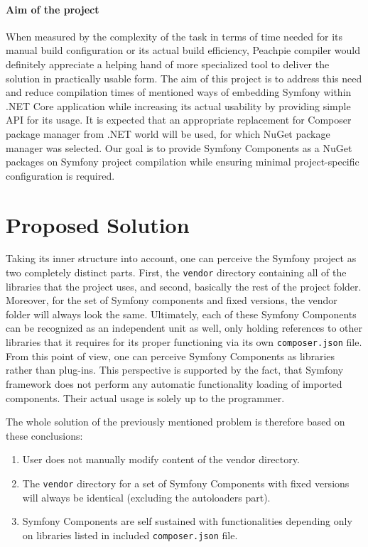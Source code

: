 \paragraph{Aim of the project} When measured by the complexity of the task in terms of time needed for its manual build configuration or its actual build efficiency, Peachpie compiler would definitely appreciate a helping hand of more specialized tool to deliver the solution in practically usable form. The aim of this project is to address this need and reduce compilation times of mentioned ways of embedding Symfony within .NET Core application while increasing its actual usability by providing simple API for its usage. It is expected that an appropriate replacement for Composer package manager from .NET world will be used, for which NuGet package manager was selected. Our goal is to provide Symfony Components as a NuGet packages on Symfony project compilation while ensuring minimal project-specific configuration is required.



\section{Proposed Solution}
Taking its inner structure into account, one can perceive the Symfony project as two completely distinct parts. First, the \texttt{vendor} directory containing all of the libraries that the project uses, and second, basically the rest of the project folder. Moreover, for the set of Symfony components and fixed versions, the vendor folder will always look the same. Ultimately, each of these Symfony Components can be recognized as an independent unit as well, only holding references to other libraries that it requires for its proper functioning via its own \texttt{composer.json} file. From this point of view, one can perceive Symfony Components as libraries rather than plug-ins. This perspective is supported by the fact, that Symfony framework does not perform any automatic functionality loading of imported components. Their actual usage is solely up to the programmer.

The whole solution of the previously mentioned problem is therefore based on these conclusions:

\begin{enumerate}[1:]
\item User does not manually modify content of the vendor directory.
\item The \texttt{vendor} directory for a set of Symfony Components with fixed versions will always be identical (excluding the autoloaders part). 
\item Symfony Components are self sustained with functionalities depending only on libraries listed in included \texttt{composer.json} file.
\end{enumerate}


